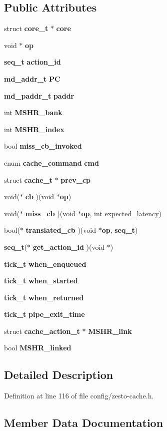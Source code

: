\subsection*{Public Attributes}
\begin{CompactItemize}
\item 
struct {\bf core\_\-t} $\ast$ {\bf core}
\item 
void $\ast$ {\bf op}
\item 
{\bf seq\_\-t} {\bf action\_\-id}
\item 
{\bf md\_\-addr\_\-t} {\bf PC}
\item 
{\bf md\_\-paddr\_\-t} {\bf paddr}
\item 
int {\bf MSHR\_\-bank}
\item 
int {\bf MSHR\_\-index}
\item 
bool {\bf miss\_\-cb\_\-invoked}
\item 
enum {\bf cache\_\-command} {\bf cmd}
\item 
struct {\bf cache\_\-t} $\ast$ {\bf prev\_\-cp}
\item 
void($\ast$ {\bf cb} )(void $\ast${\bf op})
\item 
void($\ast$ {\bf miss\_\-cb} )(void $\ast${\bf op}, int expected\_\-latency)
\item 
bool($\ast$ {\bf translated\_\-cb} )(void $\ast${\bf op}, {\bf seq\_\-t})
\item 
{\bf seq\_\-t}($\ast$ {\bf get\_\-action\_\-id} )(void $\ast$)
\item 
{\bf tick\_\-t} {\bf when\_\-enqueued}
\item 
{\bf tick\_\-t} {\bf when\_\-started}
\item 
{\bf tick\_\-t} {\bf when\_\-returned}
\item 
{\bf tick\_\-t} {\bf pipe\_\-exit\_\-time}
\item 
struct {\bf cache\_\-action\_\-t} $\ast$ {\bf MSHR\_\-link}
\item 
bool {\bf MSHR\_\-linked}
\end{CompactItemize}


\subsection{Detailed Description}


Definition at line 116 of file config/zesto-cache.h.

\subsection{Member Data Documentation}
